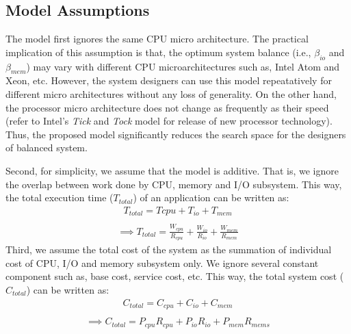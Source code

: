 \documentclass[journal]{IEEEtran}
\begin{document}

\subsection{Model Assumptions}
The model first ignores the same CPU micro architecture. The practical implication of this assumption is that, the optimum system balance (i.e., $\beta_{io}$ and $\beta_{mem}$) may vary with different CPU microarchitectures such as, Intel Atom and Xeon, etc. However, the system designers can use this model repeatatively for different micro architectures without any loss of generality. On the other hand, the processor micro architecture does not change as frequently as their speed (refer to Intel's \textit{Tick} and \textit{Tock} model for release of new processor technology). Thus, the proposed model significantly reduces the search space for the designers of balanced system.
  
Second, for simplicity, we assume that the model is additive. That is, we ignore the overlap between work done by CPU, memory and I/O subsystem. This way, the total execution time ($T_{total}$) of an application can be written as:
\begin{equation} %
\begin{split}
T_{total} = T{cpu} + T_{io} + T_{mem} \\
\end{split}
\end{equation}
\begin{equation} \label{eqn:TotalTime}
\begin{split}
\implies T_{total}  = \frac{W_{cpu}}{R_{cpu}} + \frac{W_{io}}{R_{io}} + \frac{W_{mem}}{R_{mem}}
\end{split}
\end{equation}
Third, we assume the total cost of the system as the summation of individual cost of CPU, I/O and memory subsystem only. We ignore several constant component such as, base cost, service cost, etc. This way, the total system cost ($C_{total}$) can be written as:
\begin{equation} %
\begin{split}
C_{total} = C_{cpu} + C_{io} + C_{mem} \\
\end{split}
\end{equation}
\begin{equation} \label{eqn:TotalCost}
\begin{split}
\implies C_{total} = P_{cpu}R_{cpu} + P_{io}R_{io} + P_{mem}R_{mems}
\end{split}
\end{equation}
\end{document}
